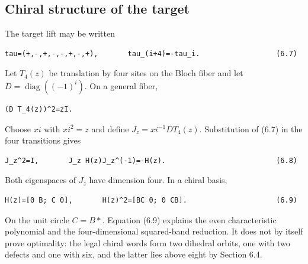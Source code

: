 \subsection{Chiral structure of the target}

The target lift may be written

\begin{lstlisting}[language={}]
tau=(+,-,+,-,-,+,-,+),       tau_(i+4)=-tau_i.                  (6.7)
\end{lstlisting}

Let \(T_4(z)\) be translation by four sites on the Bloch fiber and let
\(D=\operatorname{diag}((-1)^i)\). On a general fiber,

\begin{lstlisting}[language={}]
(D T_4(z))^2=zI.
\end{lstlisting}

Choose \(xi\) with \(xi^2=z\) and define \(J_z=xi^{-1}D T_4(z)\). Substitution of
(6.7) in the four transitions gives

\begin{lstlisting}[language={}]
J_z^2=I,       J_z H(z)J_z^(-1)=-H(z).                          (6.8)
\end{lstlisting}

Both eigenspaces of \(J_z\) have dimension four. In a chiral basis,

\begin{lstlisting}[language={}]
H(z)=[0 B; C 0],       H(z)^2=[BC 0; 0 CB].                     (6.9)
\end{lstlisting}

On the unit circle \(C=B*\). Equation (6.9) explains the even characteristic
polynomial and the four-dimensional squared-band reduction. It does not by
itself prove optimality: the legal chiral words form two dihedral orbits, one
with two defects and one with six, and the latter lies above eight by Section
6.4.
